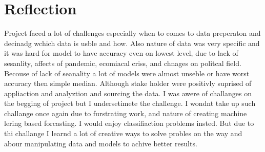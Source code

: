 \documentclass{article}
\begin{document}
\section{Reflection}
Project faced a lot of challenges especially when to comes to data preperaton and decinadg wchich data is usble and how. Also nature of data was very specific and it was hard for model to have accuracy even on lowest level, due to lack of sesanlity, affects of pandemic, ecomiacal criss, and chnages on politcal field. Becouse of lack of seanality a lot of models were almost unseble or have worst accuracy then simple median. Although stake holder were positivly suprised of appliaction and analyztion and sourcing the data. I was awere of challanges on the begging of project but I undersetimete the challenge. I wondnt take up such challange once again due to furstrating work, and nature of creating machine lering based forcasting. I would enjoy classifiaction problems insted. But due to thi challange I learnd a lot of creative ways to solve probles on the way and abour manipulating data and models to achive better results. 
\end{document}
